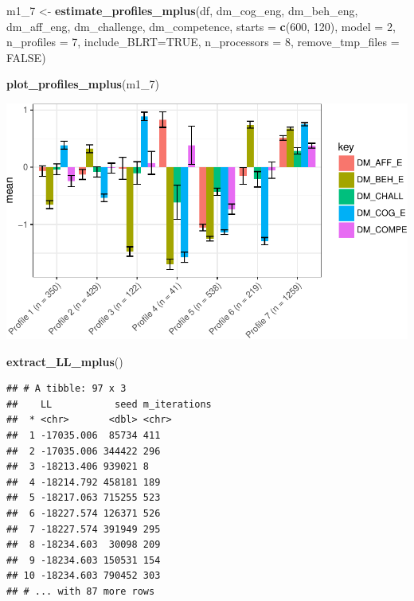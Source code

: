 \documentclass[]{book}
\newenvironment{Shaded}{\begin{snugshade}}{\end{snugshade}}
\newcommand{\KeywordTok}[1]{\textcolor[rgb]{0.13,0.29,0.53}{\textbf{#1}}}
\newcommand{\DataTypeTok}[1]{\textcolor[rgb]{0.13,0.29,0.53}{#1}}
\newcommand{\DecValTok}[1]{\textcolor[rgb]{0.00,0.00,0.81}{#1}}
\newcommand{\StringTok}[1]{\textcolor[rgb]{0.31,0.60,0.02}{#1}}
\newcommand{\OtherTok}[1]{\textcolor[rgb]{0.56,0.35,0.01}{#1}}
\newcommand{\NormalTok}[1]{#1}
\begin{document}
\begin{Shaded}
\begin{Highlighting}[]
\NormalTok{m1_}\DecValTok{7}\NormalTok{ <-}\StringTok{ }\KeywordTok{estimate_profiles_mplus}\NormalTok{(df,  }
\NormalTok{                             dm_cog_eng, dm_beh_eng, dm_aff_eng, dm_challenge, dm_competence,}
                             \DataTypeTok{starts =} \KeywordTok{c}\NormalTok{(}\DecValTok{600}\NormalTok{, }\DecValTok{120}\NormalTok{),}
                             \DataTypeTok{model =} \DecValTok{2}\NormalTok{,}
                             \DataTypeTok{n_profiles =} \DecValTok{7}\NormalTok{,}
                             \DataTypeTok{include_BLRT=}\OtherTok{TRUE}\NormalTok{,}
                             \DataTypeTok{n_processors =} \DecValTok{8}\NormalTok{, }\DataTypeTok{remove_tmp_files =} \OtherTok{FALSE}\NormalTok{)}

\KeywordTok{plot_profiles_mplus}\NormalTok{(m1_}\DecValTok{7}\NormalTok{)}
\end{Highlighting}
\end{Shaded}

\includegraphics{rosenberg-dissertation_files/figure-latex/spec-solutions-model2-7-1.pdf}

\begin{Shaded}
\begin{Highlighting}[]
\KeywordTok{extract_LL_mplus}\NormalTok{()}
\end{Highlighting}
\end{Shaded}

\begin{verbatim}
## # A tibble: 97 x 3
##    LL           seed m_iterations
##  * <chr>       <dbl> <chr>       
##  1 -17035.006  85734 411         
##  2 -17035.006 344422 296         
##  3 -18213.406 939021 8           
##  4 -18214.792 458181 189         
##  5 -18217.063 715255 523         
##  6 -18227.574 126371 526         
##  7 -18227.574 391949 295         
##  8 -18234.603  30098 209         
##  9 -18234.603 150531 154         
## 10 -18234.603 790452 303         
## # ... with 87 more rows
\end{verbatim}
\end{document}
